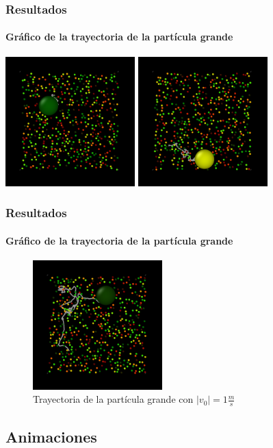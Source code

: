 \documentclass[hyperref={pdfpagelayout=SinglePage}]{beamer}
\begin{document}
\begin{frame}
\frametitle{Resultados}
\framesubtitle{Gráfico de la trayectoria de la partícula grande}
  \hfil\hfil\includegraphics[width=5cm]{500v1.png}\hfil\hfil
    \includegraphics[width=5cm]{500v2.png}\newline
  \null\hfil\hfil{}
    \hfil\hfil{}
\end{frame}

\begin{frame}
\frametitle{Resultados}
\framesubtitle{Gráfico de la trayectoria de la partícula grande}
\begin{figure}[H]
        \centering
        \includegraphics[width=5cm]{500v3.png}
        \caption{Trayectoria de la partícula grande con $|v_{0}| = 1 \frac{m}{s}$}
\end{figure}
\end{frame}

\subsection{Animaciones}
\end{document}
